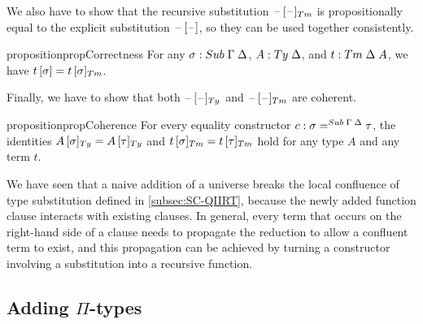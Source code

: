 \documentclass[a4paper,UKenglish,numberwithinsect,cleveref,thm-restate]{lipics-v2021}
\newcommand{\danger}{\marginpar[\hfill\dbend]{\dbend\hfill}}
\begin{document}
We also have to show that the recursive substitution $\subTm{\blank}{\blank}$ is propositionally equal to the explicit substitution ${\mathord{\hspace{1pt}\text{--}\hspace{1pt}}}\,[\mathord{\hspace{1pt}\text{--}\hspace{1pt}}]$, so they can be used together consistently.


\begin{restatable}{proposition}{propCorrectness}\label{prop:correctness-1}
  For any $\sigma : \Sub\;\Gamma\;\Delta$, $A : \Ty\;\Delta$, and $t : \Tm\;\Delta\;A$, we have $\sub{t}{\sigma} = \subTm{t}{\sigma}$.
\end{restatable}

Finally, we have to show that both $\subTy{\blank}{\blank}$ and $\subTm{\blank}{\blank}$ are coherent.
%
\begin{restatable}{proposition}{propCoherence}\label{prop:coherence-2}
  For every equality constructor $\cc : \sigma =^{\Sub\;\Gamma\;\Delta} \tau$, the identities
  \danger
    $\subTy{A}{\sigma} = \subTy{A}{\tau}$
    and
    $\subTm{t}{\sigma} = \subTm{t}{\tau}$
  hold for any type $A$ and any term $t$.
\end{restatable}

\begin{remark}
We have seen that a naive addition of a universe breaks the local confluence of type substitution defined in \cref{subsec:SC-QIIRT}, because the newly added function clause interacts with existing clauses.
In general, every term that occurs on the right-hand side of a clause needs to propagate the reduction to allow a confluent term to exist, and this propagation can be achieved by turning a constructor involving a substitution into a recursive function.
\end{remark}

\subsection{Adding \texorpdfstring{$\Pi$}{Π}-types} \label{subsec:SC+U+Pi}
\end{document}
